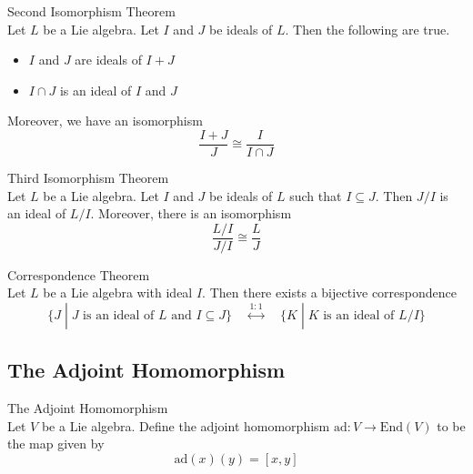 \documentclass[a4paper]{article}
\begin{document}
\begin{thm}{Second Isomorphism Theorem}{} \\Let $L$ be a Lie algebra. Let $I$ and $J$ be ideals of $L$. Then the following are true. 
\begin{itemize}
\item $I$ and $J$ are ideals of $I+J$
\item $I\cap J$ is an ideal of $I$ and $J$
\end{itemize}
Moreover, we have an isomorphism $$\frac{I+J}{J}\cong\frac{I}{I\cap J}$$
\end{thm}

\begin{thm}{Third Isomorphism Theorem}{} \\Let $L$ be a Lie algebra. Let $I$ and $J$ be ideals of $L$ such that $I\subseteq J$. Then $J/I$ is an ideal of $L/I$. Moreover, there is an isomorphism $$\frac{L/I}{J/I}\cong\frac{L}{J}$$
\end{thm}

\begin{thm}{Correspondence Theorem}{} \\Let $L$ be a Lie algebra with ideal $I$. Then there exists a bijective correspondence $$\{J\;|\;J\text{ is an ideal of }L\text{ and }I\subseteq J\}\;\;\;\;\overset{1:1}{\longleftrightarrow}\;\;\;\;\{K\;|\;K\text{ is an ideal of }L/I\}$$
\end{thm}

\subsection{The Adjoint Homomorphism}
\begin{defn}{The Adjoint Homomorphism}{} \\Let $V$ be a Lie algebra. Define the adjoint homomorphism $\text{ad}:V\to\text{End}(V)$ to be the map given by $$\text{ad}(x)(y)=[x,y]$$
\end{defn}
\end{document}
